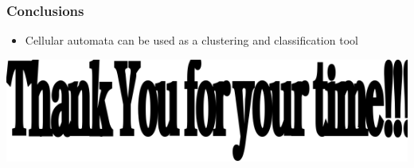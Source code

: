 \documentclass[presentation]{beamer}
\begin{document}
\begin{frame}
\frametitle{Conclusions}
\label{sec-9}

\begin{itemize}
\item Cellular automata can be used as a clustering and classification
   tool
\end{itemize}
\end{frame}
\begin{frame}

  \includegraphics[width=30em \textwidth]{./thankyou.png}
\end{frame}
\end{document}

